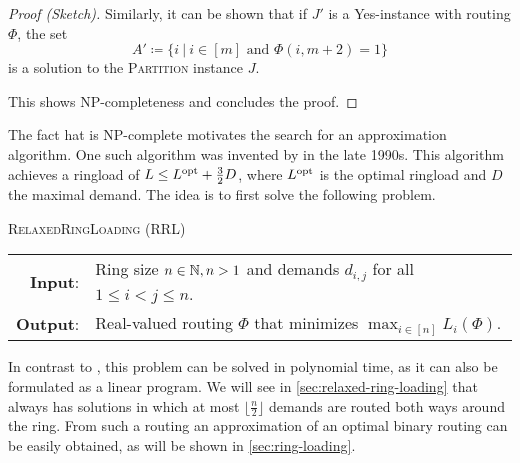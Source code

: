 \begin{proof}[Proof (Sketch)]
	Similarly, it can be shown that if $J'$ is a Yes-instance with routing $\Phi$, the set 
	\begin{equation}
		A' \coloneqq \{i \ |\ i \in [m] \text{ and } \Phi(i, m+2) = 1\}
	\end{equation} 
	is a solution to the \textsc{Partition} instance $J$.
	
	This shows NP-completeness and concludes the proof.
\end{proof}



The fact hat \RL is NP-complete motivates the search for an approximation algorithm.
One such algorithm was invented by \citet{schrijver99} in the late 1990s.
This algorithm achieves a ringload of $L \leq L^{\mathrm{opt}} + \frac{3}{2}D$, where $L^{\mathrm{opt}}$ is the optimal ringload and $D$ the maximal demand.
The idea is to first solve the following problem.
\begin{center}
	\begin{mdframed}
		\centering
		\textsc{RelaxedRingLoading} (\textsc{RRL})\\[0.7em]
		\begin{tabular}{rl}
			{\bfseries Input}: & Ring size $n \in \mathbb{N}, n > 1$ and demands $d_{i, j}$ for all $1 \leq i<j\leq n$.\\
			{\bfseries Output}: & Real-valued routing $\Phi$ that minimizes $\max_{i \in [n]} L_i(\Phi)$.
		\end{tabular}
	\end{mdframed}
\end{center}
In contrast to \RL, this problem can be solved in polynomial time, as it can also be formulated as a linear program.
We will see in \cref{sec:relaxed-ring-loading} that \RRL always has solutions in which at most $\lfloor \frac{n}{2} \rfloor$ demands are routed both ways around the ring.
From such a routing an approximation of an optimal binary routing can be easily obtained, as will be shown in \cref{sec:ring-loading}.

